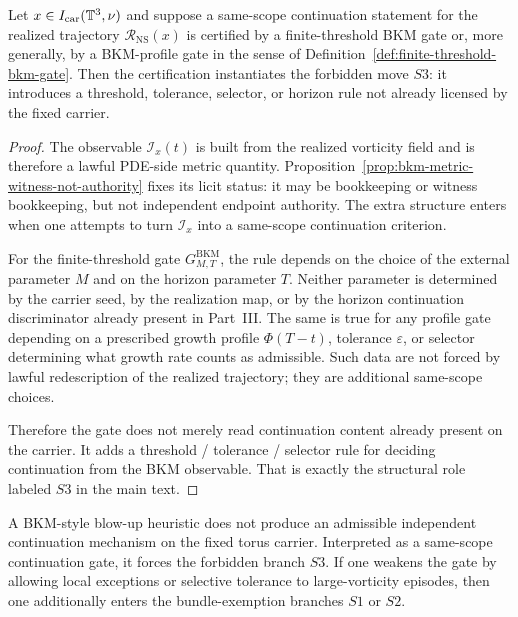 \begin{proposition}\label{prop:bkm-forces-s3}
Let $x\in I_{\mathrm{car}}(\mathbb{T}^3,\nu)$ and suppose a same-scope continuation statement for the realized
trajectory $\mathcal R_{\mathrm{NS}}(x)$ is certified by a finite-threshold BKM gate or, more generally, by a
BKM-profile gate in the sense of Definition~\ref{def:finite-threshold-bkm-gate}. Then the certification
instantiates the forbidden move $S3$: it introduces a threshold, tolerance, selector, or horizon rule
not already licensed by the fixed carrier.
\end{proposition}

\begin{proof}
The observable $\mathcal I_x(t)$ is built from the realized vorticity field and is therefore a lawful
PDE-side metric quantity. Proposition~\ref{prop:bkm-metric-witness-not-authority} fixes its licit status: it may be bookkeeping or witness bookkeeping, but not independent endpoint authority. The extra structure enters when one attempts to turn $\mathcal I_x$ into a
same-scope continuation criterion.

For the finite-threshold gate $G^{\mathrm{BKM}}_{M,T}$, the rule depends on the choice of the external
parameter $M$ and on the horizon parameter $T$. Neither parameter is determined by the carrier seed,
by the realization map, or by the horizon continuation discriminator already present in Part~III. The
same is true for any profile gate depending on a prescribed growth profile $\Phi(T-t)$, tolerance
$\varepsilon$, or selector determining what growth rate counts as admissible. Such data are not forced by
lawful redescription of the realized trajectory; they are additional same-scope choices.

Therefore the gate does not merely read continuation content already present on the carrier. It adds a
threshold / tolerance / selector rule for deciding continuation from the BKM observable. That is exactly
the structural role labeled $S3$ in the main text.
\end{proof}

\begin{corollary}\label{cor:concrete-bkm-translation}
A BKM-style blow-up heuristic does not produce an admissible independent continuation mechanism on the
fixed torus carrier. Interpreted as a same-scope continuation gate, it forces the forbidden branch $S3$.
If one weakens the gate by allowing local exceptions or selective tolerance to large-vorticity episodes,
then one additionally enters the bundle-exemption branches $S1$ or $S2$.
\end{corollary}

